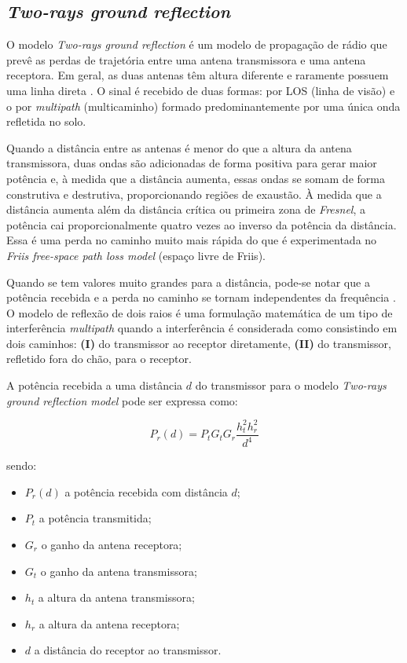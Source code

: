 \documentclass[
	12pt,				%
	twoside,			%
	a4paper,			%
	english,			%
	french,				%
	spanish,			%
	brazil				%
	]{abntex2}
\begin{document}
\subsection{\texorpdfstring{\emph{Two-rays ground
reflection}}{Two-rays ground reflection}}\label{sec:two_rays}

O modelo \emph{Two-rays ground reflection} é um modelo de propagação de
rádio que prevê as perdas de trajetória entre uma antena transmissora e
uma antena receptora. Em geral, as duas antenas têm altura diferente e
raramente possuem uma linha direta \cite{LUO}. O sinal é recebido de
duas formas: por LOS (linha de visão) e o por \emph{multipath}
(multicaminho) formado predominantemente por uma única onda refletida no
solo.

Quando a distância entre as antenas é menor do que a altura da antena
transmissora, duas ondas são adicionadas de forma positiva para gerar
maior potência e, à medida que a distância aumenta, essas ondas se somam
de forma construtiva e destrutiva, proporcionando regiões de exaustão. À
medida que a distância aumenta além da distância crítica ou primeira
zona de \emph{Fresnel}, a potência cai proporcionalmente quatro vezes ao
inverso da potência da distância. Essa é uma perda no caminho muito mais
rápida do que é experimentada no \emph{Friis free-space path loss model}
(espaço livre de Friis).

Quando se tem valores muito grandes para a distância, pode-se notar que
a potência recebida e a perda no caminho se tornam independentes da
frequência \cite{RAPPAPORT}. O modelo de reflexão de dois raios é uma
formulação matemática de um tipo de interferência \emph{multipath}
quando a interferência é considerada como consistindo em dois caminhos:
\textbf{(I)} do transmissor ao receptor diretamente, \textbf{(II)} do
transmissor, refletido fora do chão, para o receptor.

A potência recebida a uma distância \(d\) do transmissor para o modelo
\emph{Two-rays ground reflection model} pode ser expressa como:

\begin{equation}
    P_{r}(d) = P_{t}G_{t}G_{r}\frac{h^{2}_{t}h^{2}_{r}}{d^{4}}
\end{equation}

sendo:

\begin{itemize}
\item
  \(P_{r}(d)\) a potência recebida com distância \(d\);
\item
  \(P_{t}\) a potência transmitida;
\item
  \(G_{r}\) o ganho da antena receptora;
\item
  \(G_{t}\) o ganho da antena transmissora;
\item
  \(h_{t}\) a altura da antena transmissora;
\item
  \(h_{r}\) a altura da antena receptora;
\item
  \(d\) a distância do receptor ao transmissor.
\end{itemize}
\end{document}
